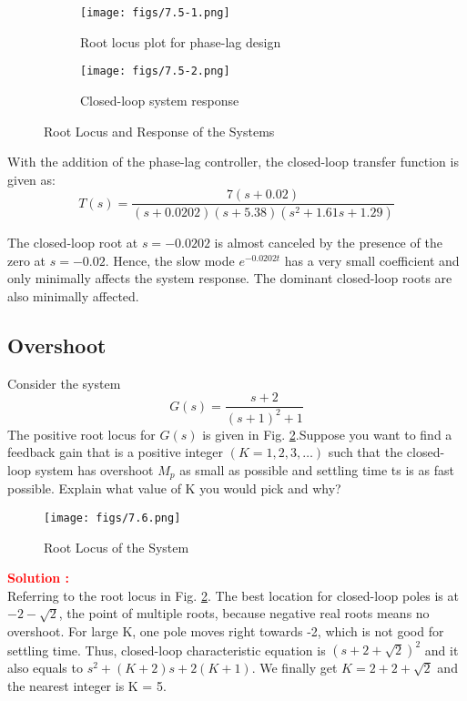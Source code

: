 \documentclass[12pt]{article}
\begin{document}
\begin{figure}[H]
    \centering
    \begin{subfigure}[b]{0.45\textwidth}
    \centering
    \texttt{[image: figs/7.5-1.png]}
     \caption{Root locus plot for phase-lag design}
     \end{subfigure}
     \begin{subfigure}[b]{0.45\textwidth}
     \centering
        \texttt{[image: figs/7.5-2.png]}
     \caption{ Closed-loop system response}
     \end{subfigure}
    \caption{Root Locus and Response of the Systems}\label{fig:prb20}
\end{figure}

\noindent With the addition of the phase-lag controller, the closed-loop transfer function is given as:
$$
T(s)=\frac{7(s+0.02)}{(s+0.0202)(s+5.38)\left(s^2+1.61 s+1.29\right)}
$$

The closed-loop root at $s=-0.0202$ is almost canceled by the presence of the zero at $s=-0.02$. Hence, the slow mode $e^{-0.0202 t}$ has a very small coefficient and only minimally affects the system response. The dominant closed-loop roots are also minimally affected.
\clearpage

\subsection{Overshoot}

Consider the system 
\[
G(s)=\frac{s + 2}{(s+1)^2 +1}
\]
The positive root locus for $G(s)$ is given in Fig. \ref{fig:prb38}.Suppose you want to find a feedback gain that is a positive integer $(K = 1, 2, 3, \hdots )$ such that the
closed-loop system has overshoot $M_p$ as small as possible and settling time ts is as fast possible. Explain what value of K you would pick and why?\\
\begin{figure}[H]
    \centering
    \texttt{[image: figs/7.6.png]}
    \caption{Root Locus of the System}
    \label{fig:prb38}
\end{figure}
\textbf{\textcolor{red}{Solution :}} \\
Referring to the root locus in Fig. \ref{fig:prb38}. The best location for closed-loop poles is at $-2-\sqrt{2}$, the point of multiple roots, because negative real roots means no overshoot. For large K, one pole moves right towards -2, which is not good for settling time. Thus, closed-loop characteristic equation is $(s+2+\sqrt{2})^2$ and it also equals to $s^2+(K+2)s+2(K+1)$. We finally get $K = 2 + 2+\sqrt{2}$ and the nearest integer is K = 5.\\ 
\clearpage
\end{document}
